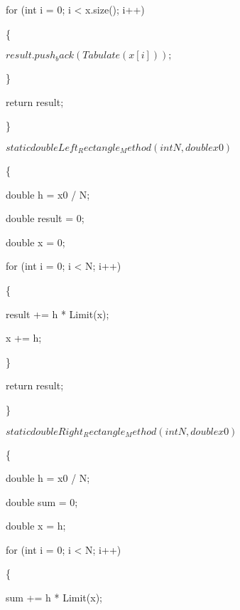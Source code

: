 \documentclass[12pt,a4paper]{report}
\begin{document}
		\hspace{1cm}for (int i = 0; i < x.size(); i++)
	
		\hspace{1cm}\{
	
			\hspace{2cm}$result.push_back(Tabulate(x[i]));$
	
		\hspace{1cm}\}
	
		\hspace{1cm}return result;
	
	\}
	
	$static double Left_Rectangle_Method(int N, double x0)$
	
	\{
	
		\hspace{1cm}double h = x0 / N;
	
		\hspace{1cm}double result = 0;
	
		\hspace{1cm}double x = 0;
	
		\hspace{1cm}for (int i = 0; i < N; i++)
	
		\hspace{1cm}\{
		
			\hspace{2cm}result += h * Limit(x);
		
			\hspace{2cm}x += h;
		
		\hspace{1cm}\}
		
		\hspace{1cm}return result;
	
	\}
	
	$static double Right_Rectangle_Method(int N, double x0)$
	
	\{
	
		\hspace{1cm}double h = x0 / N;
	
		\hspace{1cm}double sum = 0;
	
		\hspace{1cm}double x = h;
	
		\hspace{1cm}for (int i = 0; i < N; i++)
	
		\hspace{1cm}\{
	
			\hspace{2cm}sum += h * Limit(x);
	
\end{document}
